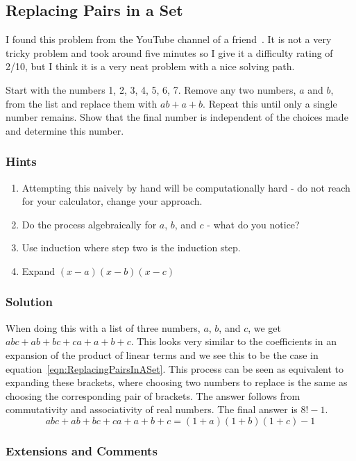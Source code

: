 \subsection{Replacing Pairs in a Set}

I found this problem from the YouTube channel of a friend~\cite{ReplacingPairsInSet}. It is not a very tricky problem and took around five minutes so I give it a difficulty rating of 2/10, but I think it is a very neat problem with a nice solving path.

Start with the numbers 1, 2, 3, 4, 5, 6, 7. Remove any two numbers, $a$ and $b$, from the list and replace them with $ab + a + b$. Repeat this until only a single number remains. Show that the final number is independent of the choices made and determine this number.

\subsubsection{Hints}

\begin{enumerate}
	\item Attempting this naively by hand will be computationally hard - do not reach for your calculator, change your approach.
	\item Do the process algebraically for $a$, $b$, and $c$ - what do you notice?
	\item Use induction where step two is the induction step.
	\item Expand $(x - a)(x - b)(x - c)$
\end{enumerate}

\subsubsection{Solution}

When doing this with a list of three numbers, $a$, $b$, and $c$, we get $abc + ab + bc + ca + a + b + c$. This looks very similar to the coefficients in an expansion of the product of linear terms and we see this to be the case in equation~\eqref{eqn:ReplacingPairsInASet}. This process can be seen as equivalent to expanding these brackets, where choosing two numbers to replace is the same as choosing the corresponding pair of brackets. The answer follows from commutativity and associativity of real numbers. The final answer is $8! - 1$.
\begin{equation}
	abc + ab + bc + ca + a + b + c = (1 + a)(1 + b)(1 + c) - 1\label{eqn:ReplacingPairsInASet}
\end{equation}


\subsubsection{Extensions and Comments}
